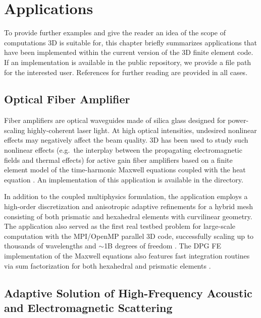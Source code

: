 %
%

\chapter{Applications}
\label{chap:applications}


To provide further examples and give the reader an idea of the scope of computations \hp3D is suitable for, this chapter briefly summarizes applications that have been implemented within the current version of the \hp3D finite element code. If an implementation is available in the public repository, we provide a file path for the interested user. References for further reading are provided in all cases.

\section{Optical Fiber Amplifier}
\label{sec:laser}

Fiber amplifiers are optical waveguides made of silica glass designed for power-scaling highly-coherent laser light. At high optical intensities, undesired nonlinear effects may negatively affect the beam quality. \hp3D has been used to study such nonlinear effects (e.g.~the interplay between the propagating electromagnetic fields and thermal effects) for active gain fiber amplifiers based on a finite element model of the time-harmonic Maxwell equations coupled with the heat equation \cite{henneking2021fiber,nagaraj2018raman}. An implementation of this application is available in the  directory. 

In addition to the coupled multiphysics formulation, the application employs a high-order discretization and anisotropic adaptive refinements \cite{henneking2021pollution} for a hybrid mesh consisting of both prismatic and hexahedral elements with curvilinear geometry. The application also served as the first real testbed problem for large-scale computation with the MPI/OpenMP parallel \hp3D code, successfully scaling up to thousands of wavelengths and $\sim$1B degrees of freedom \cite{henneking2021phd,henneking2022parallel}. The DPG FE implementation of the Maxwell equations also features fast integration routines via sum factorization for both hexahedral and prismatic elements \cite{mora2019fast,badger2020fast}.

\section{Adaptive Solution of High-Frequency Acoustic and Electromagnetic Scattering}
\label{sec:adaptive}

